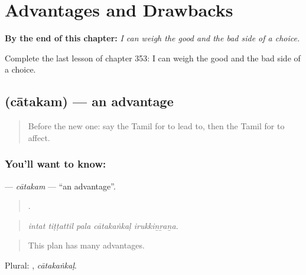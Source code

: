 
\chapter{Advantages and Drawbacks}
\label{ch:ta-advantages-and-drawbacks}

\begin{chapteropening}
\textbf{By the end of this chapter:} \emph{I can weigh the good and the bad side of a choice.}

Complete the last lesson of chapter 353: I can weigh the good and the bad side of a choice.
\end{chapteropening}

\section[\texorpdfstring{\ta{சாதகம்} (cātakam)}{சாதகம் (cātakam)}]{ (cātakam) — an advantage}

\label{lesson:TA-C353-catakam}



\begin{quote}
Before the new one: say the Tamil for to lead to, then the Tamil for to affect.
\end{quote}

\subsection*{You'll want to know: }
\textbf{} — \emph{cātakam} — \textquotedblleft{}an advantage\textquotedblright{}.

\begin{quote}
    .
\end{quote}

\begin{quote}
\emph{intat tiṭṭattil pala cātakaṅkaḷ irukkiṉṟaṉa.}
\end{quote}

\begin{quote}
This plan has many advantages.
\end{quote}

Plural: , \emph{cātakaṅkaḷ}.

